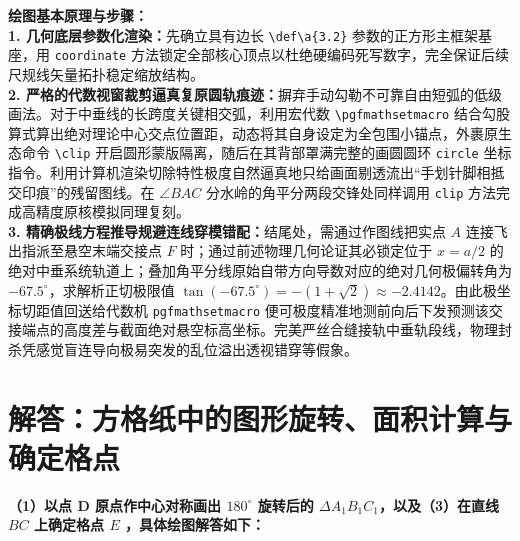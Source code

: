 \documentclass[12pt, a4paper]{ctexrep}
\begin{document}
{\small\color{blue!70!black}
\textbf{绘图基本原理与步骤：}\\
\textbf{1. 几何底层参数化渲染：}先确立具有边长 \texttt{\textbackslash def\textbackslash a\{3.2\}} 参数的正方形主框架基座，用 \texttt{coordinate} 方法锁定全部核心顶点以杜绝硬编码死写数字，完全保证后续尺规线矢量拓扑稳定缩放结构。\\
\textbf{2. 严格的代数视窗裁剪逼真复原圆轨痕迹：}摒弃手动勾勒不可靠自由短弧的低级画法。对于中垂线的长跨度关键相交弧，利用宏代数 \texttt{\textbackslash pgfmathsetmacro} 结合勾股算式算出绝对理论中心交点位置距，动态将其自身设定为全包围小锚点，外裹原生态命令 \texttt{\textbackslash clip} 开启圆形蒙版隔离，随后在其背部罩满完整的画圆圆环 \texttt{circle} 坐标指令。利用计算机渲染切除特性极度自然逼真地只给画面剔透流出“手划针脚相抵交印痕”的残留图线。在 $\angle BAC$ 分水岭的角平分两段交锋处同样调用 \texttt{clip} 方法完成高精度原核模拟同理复刻。\\
\textbf{3. 精确极线方程推导规避连线穿模错配：}结尾处，需通过作图线把实点 $A$ 连接飞出指派至悬空末端交接点 $F$ 时；通过前述物理几何论证其必锁定位于 $x=a/2$ 的绝对中垂系统轨道上；叠加角平分线原始自带方向导数对应的绝对几何极偏转角为 $-67.5^\circ$，求解析正切极限值 $\tan(-67.5^\circ) = -(1+\sqrt{2}) \approx -2.4142$。由此极坐标切距值回送给代数机 \texttt{pgfmathsetmacro} 便可极度精准地测前向后下发预测该交接端点的高度差与截面绝对悬空标高坐标。完美严丝合缝接轨中垂轨段线，物理封杀凭感觉盲连导向极易突发的乱位溢出透视错穿等假象。
}

\newpage

\newpage

\section{解答：方格纸中的图形旋转、面积计算与确定格点}

\vspace{0.6cm}

\textbf{（1）以点 D 原点作中心对称画出 $180^\circ$ 旋转后的 $\Delta A_1B_1C_1$，以及（3）在直线 $BC$ 上确定格点 $E$ ，具体绘图解答如下：}

\vspace{0.4cm}
\end{document}
